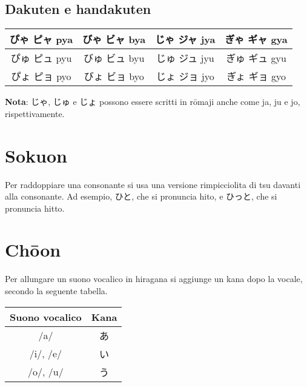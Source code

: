 \documentclass{article}
\begin{document}
        \subsection{Dakuten e handakuten}

            \begin{center}
                \begin{japanese}
                    \begin{tabular}{|c|c|c|c|}
                        \hline
                        ぴゃ ピャ pya & びゃ ビャ bya & じゃ ジャ jya & ぎゃ ギャ gya\\
                        \hline
                        ぴゅ ピュ pyu & びゅ ビュ byu & じゅ ジュ jyu & ぎゅ ギュ gyu\\
                        \hline
                        ぴょ ピョ pyo & びょ ビョ byo & じょ ジョ jyo & ぎょ ギョ gyo\\
                        \hline
                    \end{tabular}
                \end{japanese}
            \end{center}

            \textbf{Nota}: \textjapanese{じゃ}, \textjapanese{じゅ} e \textjapanese{じょ} possono essere scritti in rōmaji
            anche come \textjapanese{ja}, \textjapanese{ju} e \textjapanese{jo}, rispettivamente.

    \section{Sokuon}

        Per raddoppiare una consonante si usa una versione rimpicciolita di \textjapanese{tsu} davanti alla consonante.
        Ad esempio, \textjapanese{ひと}, che si pronuncia \textjapanese{hito}, e \textjapanese{ひっと}, che si pronuncia \textjapanese{hitto}.

    \newpage

    \section{Chōon}

        Per allungare un suono vocalico in hiragana si aggiunge un kana dopo la vocale, secondo la seguente tabella.

        \begin{center}
            \begin{japanese}
                \begin{tabular}{|c|c|}
                    \hline
                    \textitalian{Suono vocalico} & \textitalian{Kana}\\
                    \hline\hline
                    /a/ & あ\\
                    \hline
                    /i/, /e/ & い\\
                    \hline
                    /o/, /u/ & う\\
                    \hline
                \end{tabular}
            \end{japanese}
        \end{center}
\end{document}
